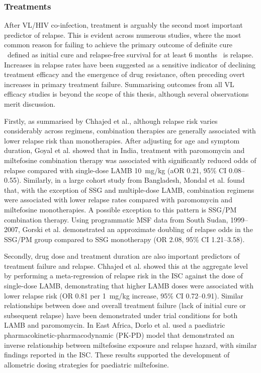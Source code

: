 \subsubsection{Treatments}
\label{sec:treatments}

After VL/HIV co-infection, treatment is arguably the second most important predictor of relapse. This is evident across numerous studies, where the most common reason for failing to achieve the primary outcome of definite cure \textemdash\ defined as initial cure and relapse-free survival for at least 6 months \textemdash\ is relapse\cite{alves2018, sundar2019, goyal2020, musa2012, musa2023}. Increases in relapse rates have been suggested as a sensitive indicator of declining treatment efficacy and the emergence of drug resistance, often preceding overt increases in primary treatment failure\cite{vangriensven2024}. Summarising outcomes from all VL efficacy studies is beyond the scope of this thesis, although several observations merit discussion.

Firstly, as summarised by Chhajed et al., although relapse risk varies considerably across regimens, combination therapies are generally associated with lower relapse risk than monotherapies\cite{chhajed2024}. After adjusting for age and symptom duration, Goyal et al. showed that in India, treatment with paromomycin and miltefosine combination therapy was associated with significantly reduced odds of relapse compared with single-dose LAMB 10~mg/kg (aOR 0.21, 95\% CI 0.08--0.55)\cite{goyal2019}. Similarly, in a large cohort study from Bangladesh, Mondal et al. found that, with the exception of SSG and multiple-dose LAMB, combination regimens were associated with lower relapse rates compared with paromomycin and miltefosine monotherapies\cite{mondal2019rx}. A possible exception to this pattern is SSG/PM combination therapy. Using programmatic MSF data from South Sudan, 1999--2007, Gorski et al. demonstrated an approximate doubling of relapse odds in the SSG/PM group compared to SSG monotherapy (OR 2.08, 95\% CI 1.21--3.58)\cite{gorski2010}.

Secondly, drug dose and treatment duration are also important predictors of treatment failure and relapse. Chhajed et al. showed this at the aggregate level by performing a meta-regression of relapse risk in the ISC against the dose of single-dose LAMB, demonstrating that higher LAMB doses were associated with lower relapse risk (OR 0.81 per 1~mg/kg increase, 95\% CI 0.72--0.91)\cite{chhajed2024}. Similar relationships between dose and overall treatment failure (lack of initial cure or subsequent relapse) have been demonstrated under trial conditions for both LAMB\cite{khalil2014} and paromomycin\cite{musa2010, hailu2010}. In East Africa, Dorlo et al. used a paediatric pharmacokinetic-pharmacodynamic (PK-PD) model that demonstrated an inverse relationship between miltefosine exposure and relapse hazard, with similar findings reported in the ISC\cite{dorlo2012}. These results supported the development of allometric dosing strategies for paediatric miltefosine\cite{dorlo2017, mbui2019}.

